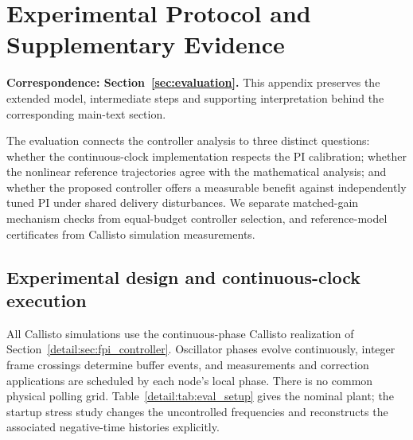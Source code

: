 \section{Experimental Protocol and Supplementary Evidence}
\label{app:evaluation}
\noindent\textbf{Correspondence: Section~\ref{sec:evaluation}.} This appendix preserves the extended model, intermediate steps and supporting interpretation behind the corresponding main-text section.


\label{detail:sec:evaluation}

The evaluation connects the controller analysis to three distinct questions:
whether the continuous-clock implementation respects the PI calibration;
whether the nonlinear reference trajectories agree with the mathematical
analysis; and whether the proposed controller offers a measurable benefit
against independently tuned PI under shared delivery disturbances. We
separate matched-gain mechanism checks from equal-budget controller
selection, and reference-model certificates from Callisto simulation measurements.

\subsection{Experimental design and continuous-clock execution}
\label{detail:subsec:eval_design}

All Callisto simulations use the continuous-phase Callisto realization of
Section~\ref{detail:sec:fpi_controller}. Oscillator phases evolve continuously,
integer frame crossings determine buffer events, and measurements and
correction applications are scheduled by each node's local phase. There
is no common physical polling grid. Table~\ref{detail:tab:eval_setup} gives the
nominal plant; the startup stress study changes the uncontrolled frequencies
and reconstructs the associated negative-time histories explicitly.

